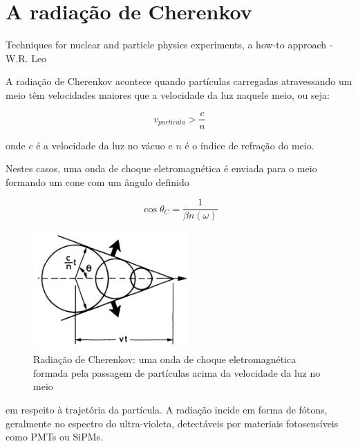 \chapter{A radiação de Cherenkov}\label{apdx:cherenkov}

Techniques for nuclear and particle physics experiments, a how-to approach - W.R. Leo

A radiação de Cherenkov acontece quando partículas carregadas atravessando um meio têm velocidades maiores que a velocidade da luz naquele meio, ou seja:

\begin{equation}
    v_{partícula} > \dfrac{c}{n}
\end{equation}

onde $c$ é a velocidade da luz no vácuo e $n$ é o índice de refração do meio.

Nestes casos, uma onda de choque eletromagnética é enviada para o meio formando um cone com um ângulo definido 

\begin{equation}
    \cos{\theta_C} = \dfrac{1}{\beta n(\omega)}
\end{equation}

\begin{figure}[H]
    \centering
    \includegraphics[width=6cm]{postextuais/apendice/figuras/cherenkov.png}
    \caption{Radiação de Cherenkov: uma onda de choque eletromagnética formada pela passagem de partículas acima da velocidade da luz no meio}
    \label{fig:my_label}
\end{figure}

em respeito à trajetória da partícula. A radiação incide em forma de fótons, geralmente no espectro do ultra-violeta, detectáveis por materiais fotosensíveis como PMTs ou \ac{SiPMs}.